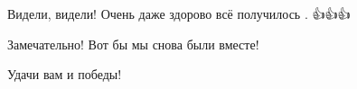 \begin{itemize}
 
Видели, видели! Очень даже здорово всё получилось . 👍👍👍

 

Замечательно! Вот бы мы снова были вместе!

 
Удачи вам и победы!

\end{itemize}

